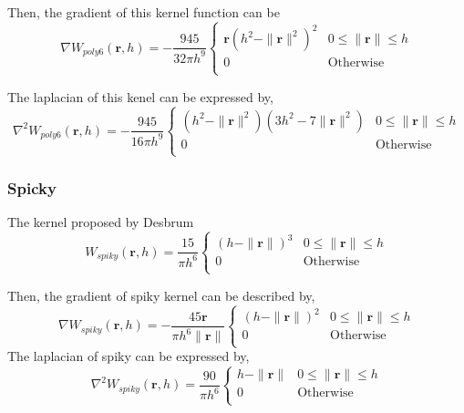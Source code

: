     Then, the gradient of this kernel function can be
    \begin{equation}
        \nabla W_{poly 6}(\textbf{r}, h) = - \frac{945}{32\pi h^9}
            \begin{cases}
                \textbf{r}(h^2 - \|\textbf{r}\|^2)^2 & 0\le\|\textbf{r}\|\le h \\
                0 & \textrm{Otherwise}\\
            \end{cases}
    \end{equation}

    The laplacian of this kenel can be expressed by, 
    \begin{equation}
        \nabla^2 W_{poly6}(\textbf{r}, h) = - \frac{945}{16\pi h^9}
            \begin{cases}
                (h^2 - \|\textbf{r}\|^2)(3h^2-7\|\textbf{r}\|^2) & 0\le\|\textbf{r}\|\le h \\
                0 & \textrm{Otherwise}\\
            \end{cases}
    \end{equation}

    \subsubsection{Spicky}

    The kernel proposed by Desbrum\cite{desbrun1996smoothed}
    \begin{equation}
        W_{spiky}(\textbf{r}, h) = \frac{15}{\pi h^6}
            \begin{cases}
                (h - \|\textbf{r}\|)^3 & 0\le\|\textbf{r}\|\le h \\
                0 & \textrm{Otherwise}\\
            \end{cases}
    \end{equation}

    Then, the gradient of spiky kernel can be described by,
    \begin{equation}
        \nabla W_{spiky}(\textbf{r}, h) = -\frac{45 \textbf{r}}{\pi h^6 \|\textbf{r}\|}
            \begin{cases}
                (h - \|\textbf{r}\|)^2 & 0\le\|\textbf{r}\|\le h \\
                0 & \textrm{Otherwise}\\
            \end{cases}
    \end{equation}
     The laplacian of spiky can be expressed by,
     \begin{equation}
        \nabla^2 W_{spiky}(\textbf{r}, h) = \frac{90}{\pi h^6}
            \begin{cases}
                h - \| \textbf{r} \| & 0 \le \| \textbf{r} \| \le h \\
                0 & \textrm{Otherwise}\\
            \end{cases}
    \end{equation}

